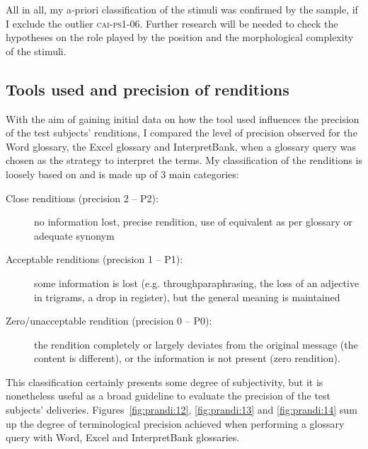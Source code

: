 \documentclass[output=paper]{langsci/langscibook}
\begin{document}
All in all, my a-priori classification of the stimuli was confirmed by the sample, if I exclude the outlier \textsc{cai}-\textsc{ps1-06}. Further research will be needed to check the hypotheses on the role played by the position and the morphological complexity of the stimuli.


\subsection{Tools used and precision of renditions}\label{sec:prandi:5.2}

With the aim of gaining initial data on how the tool used influences the precision of the test subjects’ renditions, I compared the level of precision observed for the Word glossary, the Excel glossary and InterpretBank, when a glossary query was chosen as the strategy to interpret the terms. My classification of the renditions is loosely based on \citet{Wadensjö1998} and is made up of 3 main categories:

\begin{description}
\item[Close renditions (precision 2 – P2):] no information lost, precise rendition, use of equivalent as per glossary or adequate synonym
\item[Acceptable renditions (precision 1 – P1):] some information is lost (e.g. through\linebreak paraphrasing, the loss of an adjective in trigrams, a drop in register), but the general meaning is maintained
\item[Zero/unacceptable rendition (precision 0 – P0):] the rendition completely or largely deviates from the original message (the content is different), or the information is not present (zero rendition).
\end{description}

This classification certainly presents some degree of subjectivity, but it is none\-theless useful as a broad guideline to evaluate the precision of the test subjects’ deliveries. Figures~\ref{fig:prandi:12}, \ref{fig:prandi:13} and \ref{fig:prandi:14} sum up the degree of terminological precision achieved when performing a glossary query with Word, Excel and InterpretBank glossaries. 
\end{document}
